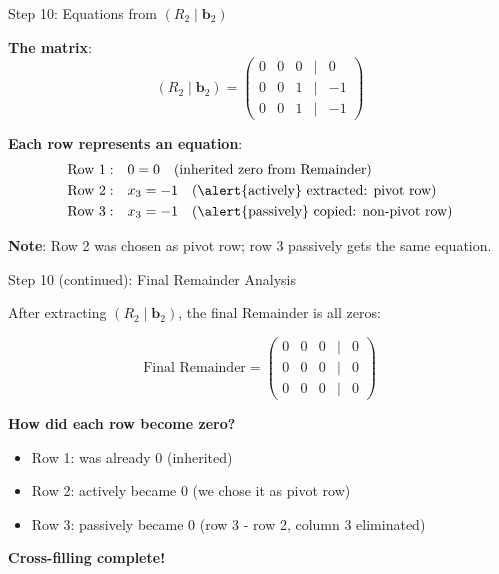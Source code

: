 \documentclass[10pt]{beamer}
\theoremstyle{definition}
\newcommand{\x}[1]{\alert{\textbf{#1}}}
\begin{document}
\begin{frame}{Step 10: Equations from $(R_2 \mid \mathbf{b}_2)$}

\x{The matrix}:
$$(R_2 \mid \mathbf{b}_2) = \begin{pmatrix}
0 & 0 & 0 & | & 0 \\
0 & 0 & 1 & | & -1 \\
0 & 0 & 1 & | & -1
\end{pmatrix}$$

\vspace{0.5em}

\x{Each row represents an equation}:
\begin{align*}
\text{Row 1}: &\quad 0 = 0 \quad \text{(inherited zero from Remainder)} \\
\text{Row 2}: &\quad x_3 = -1 \quad \text{(\alert{actively} extracted: pivot row)} \\
\text{Row 3}: &\quad x_3 = -1 \quad \text{(\alert{passively} copied: non-pivot row)}
\end{align*}

\x{Note}: Row 2 was chosen as pivot row; row 3 passively gets the same equation.

\end{frame}

\begin{frame}{Step 10 (continued): Final Remainder Analysis}

After extracting $(R_2 \mid \mathbf{b}_2)$, the final Remainder is all zeros:

$$\text{Final Remainder} = \begin{pmatrix}
0 & 0 & 0 & | & 0 \\
0 & 0 & 0 & | & 0 \\
0 & 0 & 0 & | & 0
\end{pmatrix}$$

\x{How did each row become zero?}
\begin{itemize}
\item Row 1: was already 0 (inherited)
\item Row 2: \alert{actively} became 0 (we chose it as pivot row)
\item Row 3: \alert{passively} became 0 (row 3 - row 2, column 3 eliminated)
\end{itemize}

\x{Cross-filling complete!}

\end{frame}
\end{document}
